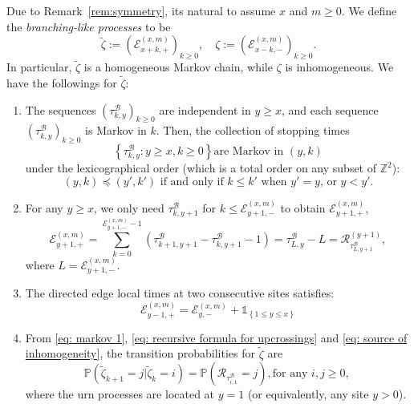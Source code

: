 \documentclass[twoside,12pt, a4paper, final]{article}
\numberwithin{equation}{section}
\theoremstyle{remark}
\begin{document}
	Due to Remark~\ref{rem:symmetry}, its natural to assume $x$ and $m \ge 0$. We define the \textit{branching-like processes} to be
	\[
	\tilde{\zeta} := \left(\mathcal{E}^{(x,m)}_{x+k,+} \right)_{k\geq 0}, \quad
	\zeta := \left(\mathcal{E}^{(x,m)}_{x-k,-} \right)_{k\geq 0}
	.\]
	In particular, $\tilde{\zeta}$ is a homogeneous Markov chain, while $\zeta$ is inhomogeneous. We have the followings for 	$\tilde{\zeta}$:
	\begin{enumerate}
		\item The sequences $(\tau^{\mathcal{B}}_{k,y})_{k\geq 0} $ are independent in $y \geq x$, and each sequence $\left(\tau^{\mathcal{B}}_{k,y}\right)_{k\geq 0} $ is Markov in $k$. Then, the collection of stopping times
		\begin{equation}\label{eq: markov 1} 
			\left\{\tau^{\mathcal{B}}_{k,y}: y\geq x, k\geq 0 \right\} \mbox{are Markov in $(y,k)$}
		\end{equation}
		under the lexicographical order (which is a total order on any subset of $\mathbb{Z}^2$): 
		\begin{equation*}\label{eq: lexicographical order}
			(y,k) \preceq (y',k')  \mbox{ if and only if }
			k \leq k'   \mbox{ when $y' = y$, or } 
			y <y'. 
		\end{equation*} 
		
		\item For any $y\geq x$, we only need $\tau^{\mathcal{B}}_{k,y+1}$ for $k\leq \mathcal{E}^{(x,m)}_{y+1,-}$ to obtain $\mathcal{E}^{(x,m)}_{y+1,+}$,
		\begin{equation} \label{eq: recursive formula for upcrossings}
			\mathcal{E}_{y+1,+}^{(x,m)}	=  \sum_{k= 0 }^{\mathcal{E}_{y+1,-}^{(x,m)}-1}	\left(\tau^{\mathcal{B}}_{k+1,y+1}-\tau^{\mathcal{B}}_{k,y+1}-1 \right) = \tau^{\mathcal{B}}_{ L,y } - L = \mathcal{R}^{(y + 1)}_{\tau^{\mathcal{B}}_{ L,y+1 }},
		\end{equation}
		where $L = \mathcal{E}_{y+1,-}^{(x,m)}$.
		
		\item The directed edge local times at two consecutive sites satisfies:
		\begin{equation}\label{eq: source of inhomogeneity}
			\mathcal{E}_{y-1,+}^{(x,m)} = \mathcal{E}_{y,-}^{(x,m)} + \mathbb{1}_{ \left\{ 1\leq y \leq x \right\} }
		\end{equation}
		
		\item  From \eqref{eq: markov 1}, \eqref{eq: recursive formula for upcrossings} and \eqref{eq: source of inhomogeneity}, the transition probabilities for $\tilde{\zeta}$ are 
		\begin{equation}\label{eq: transition prob on positive}
			\mathbb{P}\left(\tilde{\zeta}_{k+1}=j \vert \tilde{\zeta}_k =i  \right) = 
			\mathbb{P}\left( \mathcal{R}_{\tau_{i,1}^{\mathcal{B}}} = j \right), \mbox{for any $i,j\geq 0$, } 
		\end{equation} 
		where the urn processes are located at $y = 1$ (or equivalently, any site $y>0$).
	\end{enumerate}
	
\end{document}
